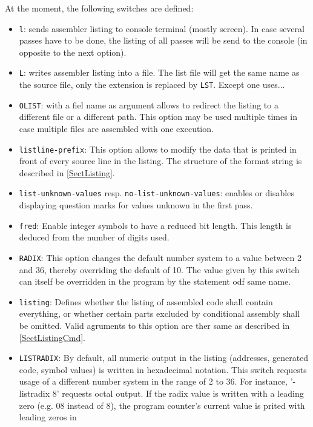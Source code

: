 \documentclass[12pt,twoside]{report}
\makeatletter
\newcommand{\tty}[1]{{\tt #1}}
\newcommand{\ttindex}[1]{\index{#1@{\tt #1}}}
\makeatother
\begin{document}
At the moment, the following switches are defined:
\ttindex{SHARED}
\begin{itemize}
\item{\tty{l}: sends assembler listing to console terminal (mostly screen).
      In case several passes have to be done, the listing of all
      passes will be send to the console (in opposite to the next
      option).}
\item{\tty{L}: writes assembler listing into a file. The list file will get
      the same name as the source file, only the extension is
      replaced by \tty{LST}.  Except one uses... }
\item{\tty{OLIST}: with a fiel name as argument allows to redirect the
      listing to a different file or a different path.  This option may
      be used multiple times in case multiple files are assembled with
      one execution.}
\item{\tty{listline-prefix}: This option allows to modify the data that
      is printed in front of every source line in the listing.  The
      structure of the format string is described in \ref{SectListing}.}
\item{{\tt list-unknown-values} resp. {\tt no-list-unknown-values}: enables
      or disables displaying question marks for values unknown in the
      first pass.}
\item{\tty{fred}: Enable integer symbols to have a reduced bit length.  This
      length is deduced from the number of digits used.}
\item{\label{radix}\tty{RADIX}: This option changes the default number system
      to a value between 2 and 36, thereby overriding the default of 10.
      The value given by this switch can itself be overridden in the program
      by the statement odf same name.}
\item{\tty{listing}: Defines whether the listing of assembled code shall
      contain everything, or whether certain parts excluded by conditional 
      assembly shall be omitted.  Valid agruments to this option are ther same
      as described in \ref{SectListingCmd}.}
\item{\label{listradix}\tty{LISTRADIX}: By default, all numeric output in the listing
      (addresses, generated code, symbol values) is written in hexadecimal
      notation.  This switch requests usage of a different number system in the
      range of 2 to 36.  For instance, '-listradix 8' requests octal output.
      If the radix value is written with a leading zero (e.g. 08 instead of 8),
      the program counter's current value is prited with leading zeros in
}
\end{itemize}
\end{document}
